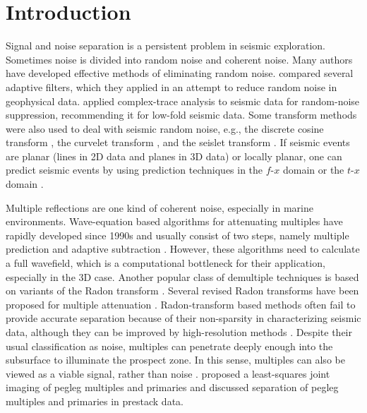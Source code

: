 \section{Introduction}
Signal and noise separation is a persistent problem in seismic
exploration. Sometimes noise is divided into random noise and coherent
noise.  Many authors have developed effective methods of eliminating
random noise. \cite{Ristau01} compared several adaptive filters, which
they applied in an attempt to reduce random noise in geophysical
data. \cite{Karsli06} applied complex-trace analysis to seismic data
for random-noise suppression, recommending it for low-fold seismic
data.  Some transform methods were also used to deal with seismic
random noise, e.g., the discrete cosine transform \cite[]{Lu07}, the
curvelet transform \cite[]{Neelamani08}, and the seislet transform
\cite[]{Fomel10a}. If seismic events are planar (lines in
2D data and planes in 3D data) or locally planar, one can predict
seismic events by using prediction techniques in the $f$-$x$ domain
\cite[]{Canales84,Sacchi01,Liu13} or the $t$-$x$ domain
\cite[]{Claerbout92,Fomel02,Sacchi09,Liu15}.

Multiple reflections are one kind of coherent noise, especially in
marine environments. Wave-equation based algorithms for attenuating
multiples have rapidly developed since 1990s and usually consist of
two steps, namely multiple prediction
\cite[]{Verschuur92,Berkhout97,Weglein97} and 
adaptive subtraction
\cite[]{GEO68-01-03460354,Guitton04,Fomel09a}.
However, these algorithms need to calculate a full wavefield, which is
  a computational bottleneck for their application,
especially in the 3D case. Another popular class of demultiple
techniques is based on variants of the Radon transform
\cite[]{Foster92}. Several revised Radon transforms have been proposed 
for multiple attenuation
\cite[]{Hunt96,Zhou96,Wang03,Hargreaves03}. Radon-transform based 
methods often fail to provide accurate separation because of their
non-sparsity in characterizing seismic data, although they can be
improved by high-resolution methods
\cite[]{Sacchi95,Herrmann00,Trad03}. Despite their usual
classification as noise, multiples can penetrate deeply enough into
the subsurface to illuminate the prospect zone. In this sense,
multiples can also be viewed as a viable signal, rather than noise
\cite[]{Reiter91,Youn01,Berkhout06}. \cite{Brown05} proposed a
least-squares joint imaging of pegleg multiples and primaries and
discussed separation of pegleg multiples and primaries in prestack
data.

